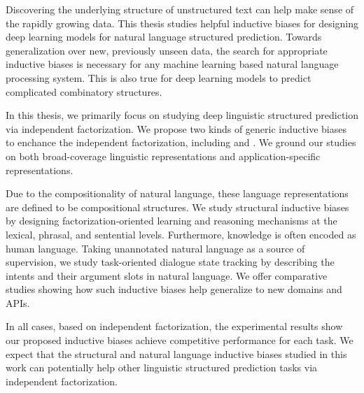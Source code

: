 
Discovering the underlying structure of unstructured text can help
make sense of the rapidly growing data. This thesis studies helpful
inductive biases for designing deep learning models for natural
language structured prediction. Towards generalization over new,
previously unseen data, the search for appropriate inductive biases is
necessary for any machine learning based natural language processing
system. This is also true for deep learning models to predict
complicated combinatory structures.

In this thesis, we primarily focus on studying deep linguistic
structured prediction via independent factorization. We propose two
kinds of generic inductive biases to enchance the independent
factorization, including  and
.  We ground our studies on
both broad-coverage linguistic representations and
application-specific representations.

Due to the compositionality of natural language, these language
representations are defined to be compositional structures. We study
structural inductive biases by designing factorization-oriented
learning and reasoning mechanisms at the lexical, phrasal, and
sentential levels. Furthermore, knowledge is often encoded as human
language. Taking unannotated natural language as a source of
supervision, we study task-oriented dialogue state tracking by
describing the intents and their argument slots in natural
language. We offer comparative studies showing how such inductive
biases help generalize to new domains and APIs.

In all cases, based on independent factorization, the experimental
results show our proposed inductive biases achieve competitive
performance for each task. We expect that the structural and natural
language inductive biases studied in this work can potentially help
other linguistic structured prediction tasks via independent
factorization.

